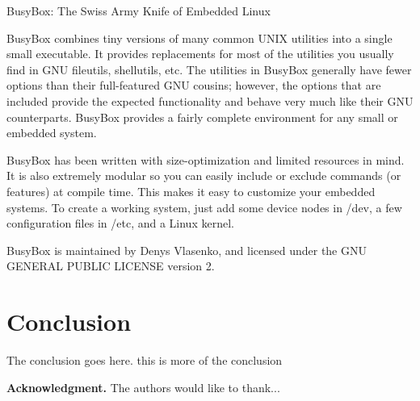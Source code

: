 \documentclass[10pt, conference, compsocconf]{IEEEtran}
\begin{document}


BusyBox: The Swiss Army Knife of Embedded Linux

BusyBox combines tiny versions of many common UNIX utilities into a single small executable. It provides replacements for most of the utilities you usually find in GNU fileutils, shellutils, etc. The utilities in BusyBox generally have fewer options than their full-featured GNU cousins; however, the options that are included provide the expected functionality and behave very much like their GNU counterparts. BusyBox provides a fairly complete environment for any small or embedded system.

BusyBox has been written with size-optimization and limited resources in mind. It is also extremely modular so you can easily include or exclude commands (or features) at compile time. This makes it easy to customize your embedded systems. To create a working system, just add some device nodes in /dev, a few configuration files in /etc, and a Linux kernel.

BusyBox is maintained by Denys Vlasenko, and licensed under the GNU GENERAL PUBLIC LICENSE version 2.

\section{Conclusion}
The conclusion goes here. this is more of the conclusion





\textbf{Acknowledgment.} The authors would like to thank...


\end{document}
